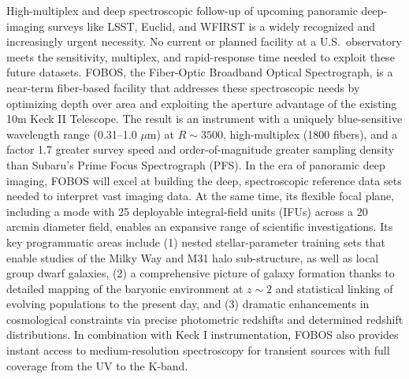 \documentclass[oneside,12pt]{amsart}
\begin{document}
\noindent High-multiplex and deep spectroscopic follow-up of upcoming
panoramic deep-imaging surveys like LSST, Euclid, and WFIRST is a widely recognized and increasingly urgent necessity.
No current or planned facility at a U.S.~observatory meets the sensitivity, multiplex, and rapid-response time needed
to exploit these future datasets. FOBOS, the Fiber-Optic Broadband Optical Spectrograph, is a near-term fiber-based
facility that addresses these spectroscopic needs by optimizing depth over area and exploiting the aperture advantage
of the existing 10m Keck II Telescope. The result is an instrument with a uniquely blue-sensitive wavelength range
(0.31--1.0 $\mu$m) at $R \sim 3500$, high-multiplex (1800 fibers), and a factor 1.7 greater survey speed and
order-of-magnitude greater sampling density than Subaru's Prime Focus Spectrograph (PFS). In the era of panoramic deep
imaging, FOBOS will excel at building the deep, spectroscopic reference data sets needed to interpret vast imaging
data. At the same time, its flexible focal plane, including a mode with 25 deployable integral-field units (IFUs)
across a 20 arcmin diameter field, enables an expansive range of scientific investigations. Its key programmatic areas
include (1) nested stellar-parameter training sets that enable studies of the Milky Way and M31 halo sub-structure, as
well as local group dwarf galaxies, (2) a comprehensive picture of galaxy formation thanks to detailed mapping of the
baryonic environment at $z \sim 2$ and statistical linking of evolving populations to the present day, and (3) dramatic
enhancements in cosmological constraints via precise photometric redshifts and determined redshift distributions.  In
combination with Keck I instrumentation, FOBOS also provides instant access to medium-resolution spectroscopy for
transient sources with full coverage from the UV to the K-band.

\pagebreak















\begin{multicols}{2}
\scriptsize


\end{multicols}

\end{document}
